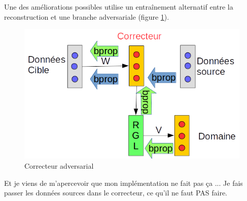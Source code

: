 \label{exp:amelioration_0}

Une des améliorations possibles utilise un entraînement alternatif entre la 
reconstruction et une branche adversariale (figure \ref{fig:correcteur_adversarial}).

\begin{figure}[H]
\centering
\includegraphics[width=0.45\linewidth]{fig/05-04-2016/Correcteur-Adversarial.png}
\caption{Correcteur adversarial}
\label{fig:correcteur_adversarial}
\end{figure}

Et je viens de m'apercevoir que mon implémentation ne fait pas ça ... Je fais 
passer les données sources dans le correcteur, ce qu'il ne faut PAS faire. 

